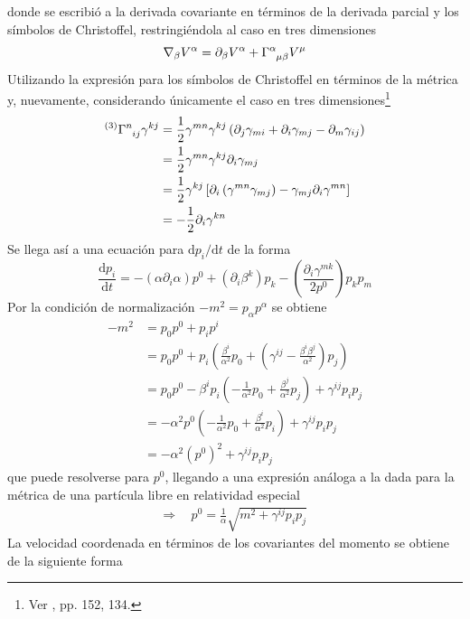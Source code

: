 \documentclass[11pt,twoside,openright,spanish]{report}
\numberwithin{equation}{chapter}
\numberwithin{figure}{chapter}
\numberwithin{table}{chapter}
\begin{document}
donde se escribió a la derivada covariante en términos de la derivada parcial y los símbolos de Christoffel, restringiéndola al caso en tres dimensiones
\begin{equation*}
\nabla_\beta V^\alpha=\partial_\beta V^\alpha+\tensor{\Gamma}{^\alpha_\mu_\beta}V^\mu
\end{equation*}
Utilizando la expresión para los símbolos de Christoffel en términos de la métrica y, nuevamente, considerando únicamente el caso en tres dimensiones\footnote{Ver \citet{schutz}, pp. 152, 134.}
\begin{align*}
^{(3)}\tensor{\Gamma}{^n_i_j}\gamma^{kj}&=\frac{1}{2}\gamma^{mn}\gamma^{kj}\left(\partial_j \gamma_{mi}+\partial_i \gamma_{mj}-\partial_m \gamma_{ij}\right)\\
&=\frac{1}{2}\gamma^{mn}\gamma^{kj}\partial_i \gamma_{mj}\\
&=\frac{1}{2}\gamma^{kj}\left[\partial_i\left(\gamma^{mn}\gamma_{mj}\right)-\gamma_{mj}\partial_i\gamma^{mn}\right]\\
&=-\frac{1}{2}\partial_i\gamma^{kn}
\end{align*}
Se llega así a una ecuación para $\text{d}p_i/\text{d}t$ de la forma
\begin{equation}
\frac{\text{d}p_i}{\text{d}t}=-(\alpha\partial_i\alpha)p^0+(\partial_i\beta^k)p_k-\left(\frac{\partial_i\gamma^{mk}}{2p^0}\right)p_kp_m
\label{dpdt}
\end{equation}
Por la condición de normalización $-m^2=p_\alpha p^\alpha$ se obtiene
\begin{align*}
-m^2&=p_0p^0+p_ip^i\\
&=p_0p^0+p_i\left(\frac{\beta^i}{\alpha^2}p_0+\left(\gamma^{ij}-\frac{\beta^i\beta^j}{\alpha^2}\right)p_j\right)\\
&=p_0p^0-\beta^ip_i\left(-\frac{1}{\alpha^2}p_0+\frac{\beta^j}{\alpha^2}p_j\right)+\gamma^{ij}p_ip_j\\
&=-\alpha^2p^0\left(-\frac{1}{\alpha^2}p_0+\frac{\beta^i}{\alpha^2}p_i\right)+\gamma^{ij}p_ip_j\\
&=-\alpha^2\left(p^0\right)^2+\gamma^{ij}p_ip_j
\end{align*}
que puede resolverse para $p^0$, llegando a una expresión análoga a la dada para la métrica de una partícula libre en relatividad especial
\begin{align}
\Rightarrow\ &\ p^0=\frac{1}{\alpha}\sqrt{m^2+\gamma^{ij}p_ip_j}
\label{p0}
\end{align}
La velocidad coordenada en términos de los covariantes del momento se obtiene de la siguiente forma
\end{document}
